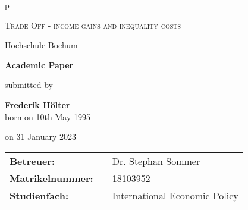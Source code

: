 \begin{titlepage}
    \begin{center}
        \begin{tabular}{p{\textwidth}}
    
            \begin{center}
                \LARGE{\textsc{Trade Off - income gains and inequality costs}}\\[1,5cm]
            \end{center}
    
            \begin{center}
                \large{Hochschule Bochum\\[1,5cm]}
            \end{center}
    
            \begin{center}
                \textbf{\Large{Academic Paper\\[1,5 cm]}}
            \end{center}
    
            \begin{center}
                submitted by\\[1,5cm]
            \end{center}
    
            \begin{center}
                \large{\textbf{Frederik Hölter}} \\
                \small{born on 10th May 1995\\[1,5cm]}
            \end{center}
    
            \begin{center}
                \large{on 31 January 2023}\\[1,5cm]
            \end{center}
    
    
            \begin{center}
                \begin{tabular}{lll}
                \textbf{Betreuer:} & & Dr. Stephan Sommer\\
                \textbf{Matrikelnummer:} & & 18103952\\
                \textbf{Studienfach: } & & International Economic Policy
        \end{tabular}
    \end{center}
    
    \end{tabular}
    \end{center}
\end{titlepage}